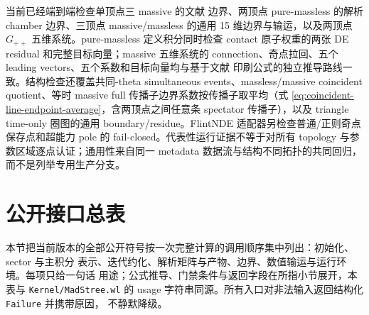 \documentclass[11pt,a4paper]{ctexart}
\begin{document}
当前已经端到端检查单顶点三 massive 的文献 \cite{Chen:2024jms} 边界、两顶点 pure-massless 的解析 chamber 边界、三顶点 massive/massless 的通用 15 维边界与输运，以及两顶点 $G_{++}$ 五维系统。pure-massless 定义积分同时检查 contact 原子权重的两张 DE residual 和完整目标向量；massive 五维系统的 connection、奇点拉回、五个 leading vectors、五个系数和目标向量均与基于文献 \cite{Chen:2023eic} 印刷公式的独立推导路线一致。结构检查还覆盖共同-theta simultaneous events、massless/massive coincident quotient、等时 massive full 传播子边界系数按传播子取平均（式 \eqref{eq:coincident-line-endpoint-average}，含两顶点之间任意条 spectator 传播子），以及 triangle time-only 圈图的通用 boundary/residue。FlintNDE 适配器另检查普通/正则奇点保存点和超能力 pole 的 fail-closed。代表性运行证据不等于对所有 topology 与参数区域逐点认证；通用性来自同一 metadata 数据流与结构不同拓扑的共同回归，而不是列举专用生产分支。

\section{公开接口总表}
\label{sec:interface-reference}

本节把当前版本的全部公开符号按一次完整计算的调用顺序集中列出：初始化、sector 与主积分
表示、迭代约化、解析矩阵与产物、边界、数值输运与运行环境。每项只给一句话
用途；公式推导、门禁条件与返回字段在所指小节展开，本表与 \texttt{Kernel/MadStree.wl}
的 usage 字符串同源。所有入口对非法输入返回结构化 \texttt{Failure} 并携带原因，
不静默降级。
\end{document}
